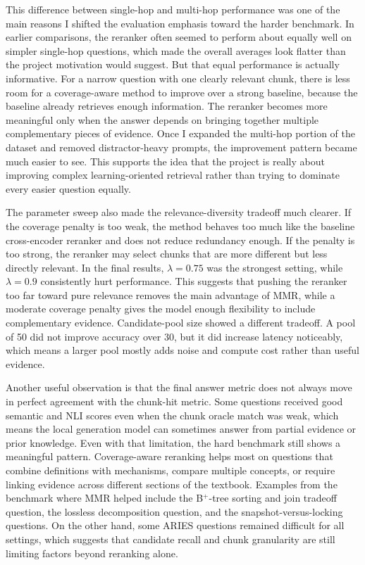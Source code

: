 \documentclass[sigconf]{acmart}
\begin{document}
This difference between single-hop and multi-hop performance was one of the main reasons I shifted the evaluation emphasis toward the harder benchmark. In earlier comparisons, the reranker often seemed to perform about equally well on simpler single-hop questions, which made the overall averages look flatter than the project motivation would suggest. But that equal performance is actually informative. For a narrow question with one clearly relevant chunk, there is less room for a coverage-aware method to improve over a strong baseline, because the baseline already retrieves enough information. The reranker becomes more meaningful only when the answer depends on bringing together multiple complementary pieces of evidence. Once I expanded the multi-hop portion of the dataset and removed distractor-heavy prompts, the improvement pattern became much easier to see. This supports the idea that the project is really about improving complex learning-oriented retrieval rather than trying to dominate every easier question equally.

The parameter sweep also made the relevance-diversity tradeoff much clearer. If the coverage penalty is too weak, the method behaves too much like the baseline cross-encoder reranker and does not reduce redundancy enough. If the penalty is too strong, the reranker may select chunks that are more different but less directly relevant. In the final results, \(\lambda=0.75\) was the strongest setting, while \(\lambda=0.9\) consistently hurt performance. This suggests that pushing the reranker too far toward pure relevance removes the main advantage of MMR, while a moderate coverage penalty gives the model enough flexibility to include complementary evidence. Candidate-pool size showed a different tradeoff. A pool of 50 did not improve accuracy over 30, but it did increase latency noticeably, which means a larger pool mostly adds noise and compute cost rather than useful evidence.

Another useful observation is that the final answer metric does not always move in perfect agreement with the chunk-hit metric. Some questions received good semantic and NLI scores even when the chunk oracle match was weak, which means the local generation model can sometimes answer from partial evidence or prior knowledge. Even with that limitation, the hard benchmark still shows a meaningful pattern. Coverage-aware reranking helps most on questions that combine definitions with mechanisms, compare multiple concepts, or require linking evidence across different sections of the textbook. Examples from the benchmark where MMR helped include the B\(^+\)-tree sorting and join tradeoff question, the lossless decomposition question, and the snapshot-versus-locking questions. On the other hand, some ARIES questions remained difficult for all settings, which suggests that candidate recall and chunk granularity are still limiting factors beyond reranking alone.
\end{document}
